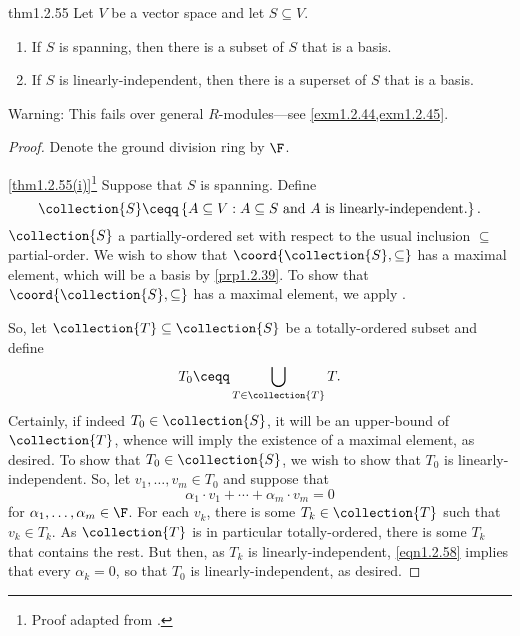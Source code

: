 \begin{prp}{}{thm1.2.55}
	Let $V$ be a vector space and let $S\subseteq V$.
	\begin{enumerate}
		\item \label{thm1.2.55(i)}If $S$ is spanning, then there is a subset of $S$ that is a basis.
		\item \label{thm1.2.55(ii)}If $S$ is linearly-independent, then there is a superset of $S$ that is a basis.
	\end{enumerate}
	\begin{rmk}
		Warning:  This fails over general $R$-modules---see \cref{exm1.2.44,exm1.2.45}.
	\end{rmk}
	\begin{proof}
		Denote the ground division ring by $\F$.
		
		\blni
		\cref{thm1.2.55(i)}\footnote{Proof adapted from \cite{Conrad}.} Suppose that $S$ is spanning.  Define
		\begin{equation*}
			\collection{S}\ceqq \left\{ A\subseteq V:A\subseteq S\text{ and }A\text{ is linearly-independent.}\right\} .
		\end{equation*}
		$\collection{S}$ a partially-ordered set with respect to the usual inclusion $\subseteq$ partial-order.  We wish to show that $\coord{\collection{S},\subseteq}$ has a maximal element, which will be a basis by \cref{prp1.2.39}.  To show that $\coord{\collection{S},\subseteq}$ has a maximal element, we apply .
		
		So, let $\collection{T}\subseteq \collection{S}$ be a totally-ordered subset and define
		\begin{equation}
			T_0\ceqq \bigcup _{T\in \collection{T}}T.
		\end{equation}
		Certainly, if indeed $T_0\in \collection{S}$, it will be an upper-bound of $\collection{T}$, whence  will imply the existence of a maximal element, as desired.  To show that $T_0\in \collection{S}$, we wish to show that $T_0$ is linearly-independent.  So, let $v_1,\ldots ,v_m\in T_0$ and suppose that
		\begin{equation}\label{eqn1.2.58}
			\alpha _1\cdot v_1+\cdots +\alpha _m\cdot v_m=0
		\end{equation}
		for $\alpha _1,\ldots ,\alpha _m\in \F$.  For each $v_k$, there is some $T_k\in \collection{T}$ such that $v_k\in T_k$.  As $\collection{T}$ is in particular totally-ordered, there is some $T_k$ that contains the rest.  But then, as $T_k$ is linearly-independent, \eqref{eqn1.2.58} implies that every $\alpha _k=0$, so that $T_0$ is linearly-independent, as desired.
		

\end{proof}
\end{prp}
